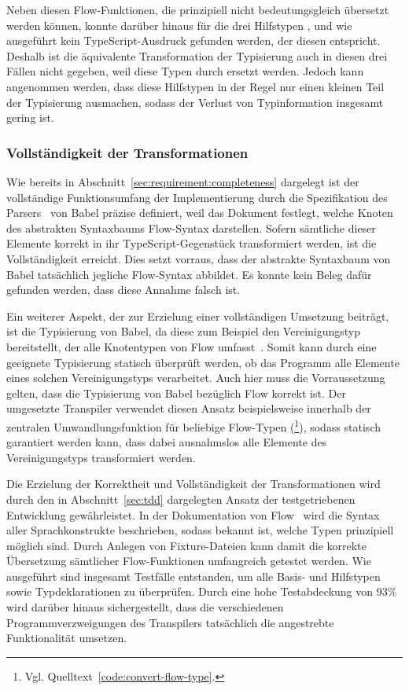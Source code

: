 Neben diesen Flow-Funktionen, die prinzipiell nicht bedeutungsgleich übersetzt werden können, konnte darüber hinaus für die drei Hilfstypen ,  und  wie ausgeführt kein TypeScript-Ausdruck gefunden werden, der diesen entspricht. Deshalb ist die äquivalente Transformation der Typisierung auch in diesen drei Fällen nicht gegeben, weil diese Typen durch  ersetzt werden. Jedoch kann angenommen werden, dass diese Hilfstypen in der Regel nur einen kleinen Teil der Typisierung ausmachen, sodass der Verlust von Typinformation insgesamt gering ist.

\subsubsection{Vollständigkeit der Transformationen}

Wie bereits in Abschnitt~\ref{sec:requirement:completeness} dargelegt ist der vollständige Funktionsumfang der Implementierung durch die Spezifikation des Parsers~\autocite{BABEL:PARSER_SPEC} von Babel präzise definiert, weil das Dokument festlegt, welche Knoten des abstrakten Syntaxbaums Flow-Syntax darstellen. Sofern sämtliche dieser Elemente korrekt in ihr TypeScript-Gegenstück transformiert werden, ist die Vollständigkeit erreicht. Dies setzt vorraus, dass der abstrakte Syntaxbaum von Babel tatsächlich jegliche Flow-Syntax abbildet. Es konnte kein Beleg dafür gefunden werden, dass diese Annahme falsch ist.

Ein weiterer Aspekt, der zur Erzielung einer vollständigen Umsetzung beiträgt, ist die Typisierung von Babel, da diese zum Beispiel den Vereinigungstyp  bereitstellt, der alle Knotentypen von Flow umfasst~\autocite{BABEL:TYPES}. Somit kann durch eine geeignete Typisierung statisch überprüft werden, ob das Programm alle Elemente eines solchen Vereinigungstyps verarbeitet. Auch hier muss die Vorraussetzung gelten, dass die Typisierung von Babel bezüglich Flow korrekt ist.
Der umgesetzte Transpiler verwendet diesen Ansatz beispielsweise innerhalb der zentralen Umwandlungsfunktion für beliebige Flow-Typen (\footnote{Vgl. Quelltext~\ref{code:convert-flow-type}.}), sodass statisch garantiert werden kann, dass dabei ausnahmslos alle Elemente des Vereinigungstyps  transformiert werden.

Die Erzielung der Korrektheit und Vollständigkeit der Transformationen wird durch den in Abschnitt~\ref{sec:tdd} dargelegten Ansatz der testgetriebenen Entwicklung gewährleistet. In der Dokumentation von Flow~\autocite{FLOW:TYPE_ANNOTATIONS} wird die Syntax aller Sprachkonstrukte beschrieben, sodass bekannt ist, welche Typen prinzipiell möglich sind. Durch Anlegen von Fixture-Dateien kann damit die korrekte Übersetzung sämtlicher Flow-Funktionen umfangreich getestet werden. Wie ausgeführt sind insgesamt \numberOfTests Testfälle entstanden, um alle Basis- und Hilfstypen sowie Typdeklarationen zu überprüfen. Durch eine hohe Testabdeckung von 93\% wird darüber hinaus sichergestellt, dass die verschiedenen Programmverzweigungen des Transpilers tatsächlich die angestrebte Funktionalität umsetzen.

